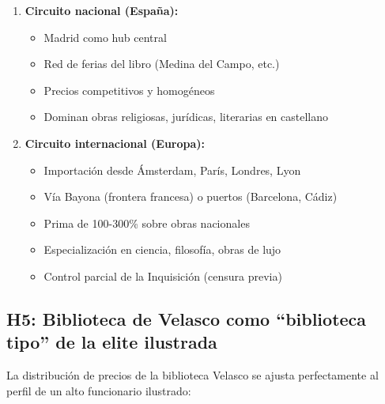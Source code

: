 \documentclass[12pt,a4paper]{article}
\begin{document}
\begin{enumerate}
    \item \textbf{Circuito nacional (España):}
    \begin{itemize}
        \item Madrid como hub central
        \item Red de ferias del libro (Medina del Campo, etc.)
        \item Precios competitivos y homogéneos
        \item Dominan obras religiosas, jurídicas, literarias en castellano
    \end{itemize}

    \item \textbf{Circuito internacional (Europa):}
    \begin{itemize}
        \item Importación desde Ámsterdam, París, Londres, Lyon
        \item Vía Bayona (frontera francesa) o puertos (Barcelona, Cádiz)
        \item Prima de 100-300\% sobre obras nacionales
        \item Especialización en ciencia, filosofía, obras de lujo
        \item Control parcial de la Inquisición (censura previa)
    \end{itemize}
\end{enumerate}

\subsection{H5: Biblioteca de Velasco como ``biblioteca tipo'' de la elite ilustrada}

La distribución de precios de la biblioteca Velasco se ajusta perfectamente al perfil de un alto funcionario ilustrado:
\end{document}
